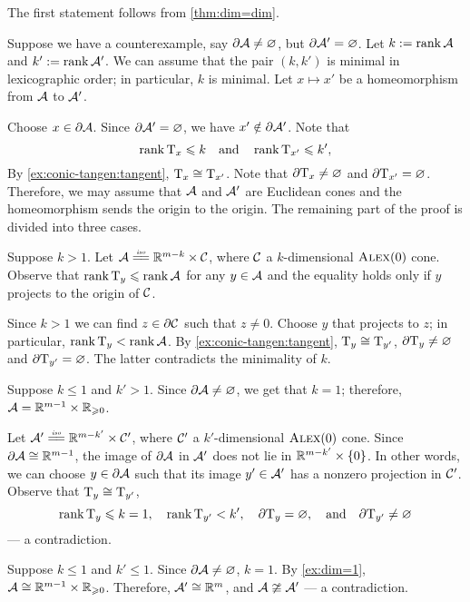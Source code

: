 The first statement follows from \ref{thm:dim=dim}.

Suppose we have a counterexample, say $\partial \mathcal{A}\ne \varnothing$, but $\partial \mathcal{A}'=\varnothing$.
Let $k\mathrel{:=}\operatorname{\rm rank}\nolimits \mathcal{A}$ and $k'\mathrel{:=}\operatorname{\rm rank}\nolimits \mathcal{A}'$.
We can assume that the pair $(k,k')$ is minimal in lexicographic order;
in particular, $k$ is minimal.
Let $x\mapsto x'$ be a homeomorphism from $\mathcal{A}$ to $\mathcal{A}'$.

Choose $x\in \partial \mathcal{A}$.
Since $\partial \mathcal{A}'=\varnothing$, we have $x'\notin \partial \mathcal{A}'$.
Note that 
\[\operatorname{\rm rank}\nolimits \mathrm{T}_x\leqslant k
\quad\text{and}\quad
\operatorname{\rm rank}\nolimits \mathrm{T}_{x'}\leqslant k',
\]
By \ref{ex:conic-tangen:tangent}, $\mathrm{T}_x\cong\mathrm{T}_{x'}$.
Note that $\partial \mathrm{T}_x\ne\varnothing$ and $\partial \mathrm{T}_{x'}=\varnothing$.
Therefore, we may assume that $\mathcal{A}$ and $\mathcal{A}'$ are Euclidean cones
and the homeomorphism sends the origin to the origin.
The remaining part of the proof is divided into three cases.

Suppose $k>1$.
Let $\spc{A}\iso \RR^{m-k}\times \spc{C}$, where $\mathcal{C}$ a $k$-dimensional $\textsc{Alex}(0)$ cone.
Observe that $\operatorname{\rm rank}\nolimits\mathrm{T}_y\leqslant\operatorname{\rm rank}\nolimits\mathcal{A}$ for any $y\in\mathcal{A}$ and the equality holds only if $y$ projects to the origin of $\mathcal{C}$.

Since $k>1$ we can find $z\in\partial\mathcal{C}$ such that $z\ne 0$.
Choose $y$ that projects to $z$;
in particular, $\operatorname{\rm rank}\nolimits\mathrm{T}_y<\operatorname{\rm rank}\nolimits\mathcal{A}$.
By \ref{ex:conic-tangen:tangent}, $\mathrm{T}_y\cong\mathrm{T}_{y'}$,
$\partial  \mathrm{T}_y\ne\varnothing$ and $\partial \mathrm{T}_{y'}=\varnothing$.
The latter contradicts the minimality of $k$.

 Suppose $k\le1$ and $k'>1$.
Since $\partial \mathcal{A}\ne \varnothing$, we get that $k=1$;
therefore, $\mathcal{A}=\mathbb{R}^{m-1}\times\mathbb{R}_{\geqslant0}$.

Let $\spc{A}'\iso \RR^{m-k'}\times \spc{C}'$, where $\mathcal{C}'$ a $k'$-dimensional $\textsc{Alex}(0)$ cone.
Since $\partial\mathcal{A}\cong\mathbb{R}^{m-1}$,
the image of $\partial\mathcal{A}$ in $\mathcal{A}'$ does not lie in $\mathbb{R}^{m-k'}\times\{0\}$.
In other words, we can choose $y\in \partial \mathcal{A}$ such that its image $y'\in \mathcal{A}'$ has a nonzero projection in $\mathcal{C}'$.
Observe that $\mathrm{T}_y\cong\mathrm{T}_{y'}$,
\[
\operatorname{\rm rank}\nolimits\mathrm{T}_y\leqslant k=1,
\quad
\operatorname{\rm rank}\nolimits\mathrm{T}_{y'}< k',
\quad
\partial \mathrm{T}_y=\varnothing,
\quad\text{and}\quad
\partial \mathrm{T}_{y'}\ne \varnothing\]
--- a contradiction.

Suppose $k\le 1$ and $k'\le 1$.
Since $\partial \mathcal{A}\ne \varnothing$, $k=1$.
By \ref{ex:dim=1}, $\mathcal{A}\cong \mathbb{R}^{m-1}\times\mathbb{R}_{\geqslant0}$.
Therefore, $\mathcal{A}'\cong\mathbb{R}^m$, and $\mathcal{A}\ncong\mathcal{A}'$ --- a contradiction.
\qeds

